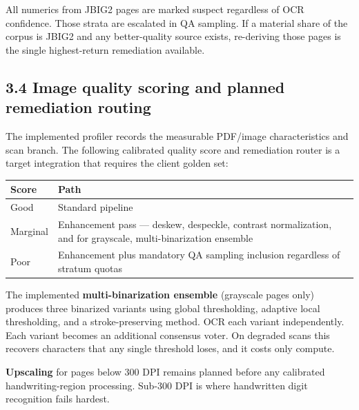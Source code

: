 \documentclass[
]{article}
\newcounter{none} %
\begin{document}
All numerics from JBIG2 pages are marked suspect regardless of OCR
confidence. Those strata are escalated in QA sampling. If a material
share of the corpus is JBIG2 and any better-quality source exists,
re-deriving those pages is the single highest-return remediation
available.

\subsection{3.4 Image quality scoring and planned remediation
routing}\label{image-quality-scoring-and-planned-remediation-routing}

The implemented profiler records the measurable PDF/image
characteristics and scan branch. The following calibrated quality score
and remediation router is a target integration that requires the client
golden set:

{\def\LTcaptype{none} %
\begin{longtable}[]{@{}
  >{\raggedright\arraybackslash}p{}
  >{\raggedright\arraybackslash}p{}@{}}
\toprule\noalign{}
\begin{minipage}[b]{\linewidth}\raggedright
Score
\end{minipage} & \begin{minipage}[b]{\linewidth}\raggedright
Path
\end{minipage} \\
\midrule\noalign{}
\endhead
\bottomrule\noalign{}
\endlastfoot
Good & Standard pipeline \\
Marginal & Enhancement pass --- deskew, despeckle, contrast
normalization, and for grayscale, multi-binarization ensemble \\
Poor & Enhancement plus mandatory QA sampling inclusion regardless of
stratum quotas \\
\end{longtable}
}

The implemented \textbf{multi-binarization ensemble} (grayscale pages
only) produces three binarized variants using global thresholding,
adaptive local thresholding, and a stroke-preserving method. OCR each
variant independently. Each variant becomes an additional consensus
voter. On degraded scans this recovers characters that any single
threshold loses, and it costs only compute.

\textbf{Upscaling} for pages below 300 DPI remains planned before any
calibrated handwriting-region processing. Sub-300 DPI is where
handwritten digit recognition fails hardest.
\end{document}
